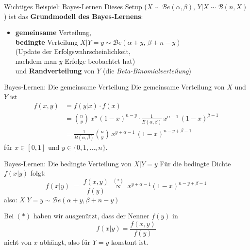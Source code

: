 \documentclass[
  10pt,
  ignorenonframetext,
]{beamer}
\providecommand{\tightlist}{%
  \setlength{\itemsep}{0pt}\setlength{\parskip}{0pt}}
\begin{document}
\begin{frame}{Wichtiges Beispiel: Bayes-Lernen}
\protect\hypertarget{wichtiges-beispiel-bayes-lernen}{}
Dieses Setup (\(X \sim {\mathcal B}e(\alpha, \beta)\),
\(Y|X \sim {\mathcal B}(n, X)\)) ist das \textbf{Grundmodell des
Bayes-Lernens}:

\begin{itemize}
\tightlist
\item
  \textbf{gemeinsame} Verteilung,\\
  \textbf{bedingte} Verteilung
  \(X|Y=y \sim {\mathcal B}e(\alpha + y,\, \beta + n - y)\)\\
  (Update der Erfolgswahrscheinlichkeit,\\
  nachdem man \(y\) Erfolge beobachtet hat)\\
  und \textbf{Randverteilung} von \(Y\) (die
  \emph{Beta-Binomialverteilung})
\end{itemize}
\end{frame}

\begin{frame}{Bayes-Lernen: Die gemeinsame Verteilung}
\protect\hypertarget{bayes-lernen-die-gemeinsame-verteilung}{}
Die gemeinsame Verteilung von \(X\) und \(Y\) ist \begin{align*}
f(x,y) & =  f(y|x) \cdot f(x)\\
      & =  {n \choose y} \, x^y \, (1 - x)^{n - y} \cdot \frac{1}{B(\alpha, \beta)} \, x^{\alpha - 1} \, (1 - x)^{\beta - 1}\\
      & =  \frac{1}{B(\alpha, \beta)}{n \choose y} \, x^{y + \alpha -1} \, (1 - x)^{n - y + \beta -1}
\end{align*} für \(x \in [0,1]\) und \(y \in \{0, 1, ..., n \}\).
\end{frame}

\begin{frame}{Bayes-Lernen: Die bedingte Verteilung von \(X|Y=y\)}
\protect\hypertarget{bayes-lernen-die-bedingte-verteilung-von-xyy}{}
Für die bedingte Dichte \(f(x|y)\) folgt: \[
f(x|y) \; = \; \frac{f(x,y)}{f(y)} \; \stackrel{(*)}{\propto} \;
x^{y + \alpha - 1} (1 - x)^{n - y + \beta -1}
\] also: \(X|Y=y \sim {\mathcal Be}(\alpha + y, \beta + n -y)\)

Bei \((*)\) haben wir ausgenützt, dass der Nenner \(f(y)\) in \[
f(x|y) = \frac{f(x,y)}{f(y)}
\] nicht von \(x\) abhängt, also für \(Y = y\) konstant ist.

\end{frame}
\end{document}
